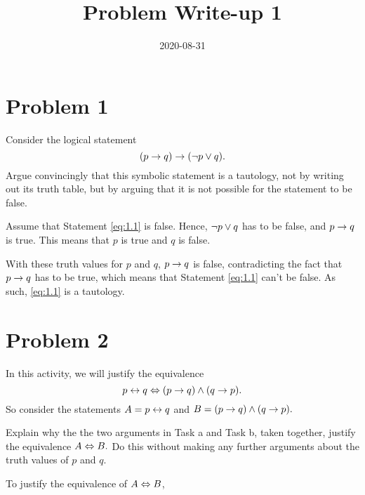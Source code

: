 \documentclass[12pt,a4paper]{article}
\title{Problem Write-up 1}
\date{2020-08-31}
\begin{document}
	\section{Problem 1}
    \begin{problem}
        Consider the logical statement
        \begin{equation} \label{eq:1.1}
        	(p \rightarrow q) \rightarrow (\neg p \vee q) \text{.}
        \end{equation}
        Argue convincingly that this symbolic statement is a tautology, not by writing out its truth table, but by arguing that it is not possible for the statement to be false.
    \end{problem}
    
    \begin{answer}
        Assume that Statement \ref{eq:1.1} is false. Hence, \(\neg p \vee q\) has to be false, and \(p \rightarrow q\) is true. This means that \(p\) is true and \(q\) is false.

       	With these truth values for \(p\) and \(q\), \(p \rightarrow q\) is false, contradicting the fact that \(p \rightarrow q\) has to be true, which means that Statement \ref{eq:1.1} can't be false. As such, \eqref{eq:1.1} is a tautology.
        
    \end{answer}

    \section{Problem 2}
    \begin{problem}
        In this activity, we will justify the equivalence
        \begin{equation} \label{eq:2.1}
        	p \leftrightarrow q \Leftrightarrow (p\rightarrow q) \wedge (q \rightarrow p) \text{.}
        \end{equation}
        So consider the statements \(A = p \leftrightarrow q\) and \(B = (p\rightarrow q) \wedge (q \rightarrow p)\text{.}\)

        Explain why the the two arguments in Task a and Task b, taken together, justify the equivalence \(A \Leftrightarrow B\text{.}\) Do this without making any further arguments about the truth values of \(p\) and \(q\).
    \end{problem}
    
    \begin{answer}
        To justify the equivalence of \(A \Leftrightarrow B\), 
    \end{answer}
    
\end{document}
